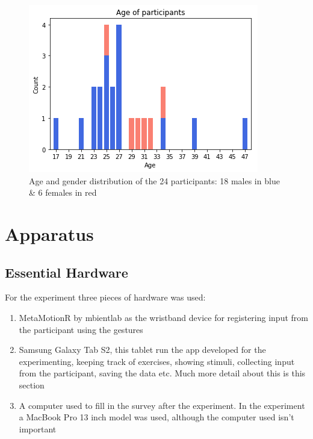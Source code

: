 \begin{figure}[h!]
    \centering
    \includegraphics[width=.6\textwidth]{figures/age_gender.png}
    \caption{Age and gender distribution of the 24 participants: 18 males in blue \& 6 females in red}
    \label{age_gender}
\end{figure}



\section{Apparatus}
\subsection{Essential Hardware}
For the experiment three pieces of hardware was used:
\begin{enumerate}
\item MetaMotionR by mbientlab\cite{mbient} as the wristband device for registering input from the participant using the gestures
\item Samsung Galaxy Tab S2\cite{samsung}, this tablet run the app developed for the experimenting, keeping track of exercises, showing stimuli, collecting input from the participant, saving the data etc. Much more detail about this is this section
\item A computer used to fill in the survey after the experiment. In the experiment a MacBook Pro 13 inch model was used, although the computer used isn't important
\end{enumerate}

